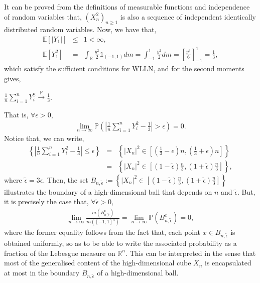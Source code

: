 \documentclass{article}
\begin{document}
It can be proved from the definitions of measurable functions and independence of random variables that, $(X_n^2)_{n\geq1}$ is also a sequence of independent identically distributed random variables. Now, we have that,
\begin{eqnarray}
\nonumber
\mathbb{E}[|Y_1|] &\leq& 1 < \infty,\\
\nonumber
\mathbb{E}[Y_1^2] &=& \int_\mathbb{R}\frac{y^2}{2} \mathds{1}_{(-1,1)}dm = \int_{-1}^{1}\frac{y^2}{2}dm = \left[\frac{y^3}{6}\right]_{-1}^{1} = \frac{1}{3},
\end{eqnarray}
which satisfy the sufficient conditions for WLLN, and for the second moments gives,
\begin{center}
$\frac{1}{n}\sum_{i=1}^{n}Y_i^2 \xrightarrow{\mathbb{P}} \frac{1}{3}$.
\end{center}
That is, $\forall \epsilon > 0$,
\begin{eqnarray}
\nonumber
\lim_{n\to\infty}\mathbb{P}\left(\left|\frac{1}{n}\sum_{i=1}^{n}Y_i^2 - \frac{1}{3}\right| > \epsilon\right) = 0.
\end{eqnarray}
Notice that, we can write,
\begin{eqnarray}
\nonumber
\left\{\left|\frac{1}{n}\sum_{i=1}^{n}Y_i^2 - \frac{1}{3}\right| \leq \epsilon\right\} &=& \left\{|X_n|^2 \in \left[\left(\frac{1}{3} - \epsilon\right)n,\left(\frac{1}{3} + \epsilon\right)n\right]\right\}\\
\nonumber
&=& \left\{|X_n|^2 \in \left[\left(1 - \tilde{\epsilon}\right)\frac{n}{3},\left(1 + \tilde{\epsilon}\right)\frac{n}{3}\right]\right\},
\end{eqnarray}
where $\tilde{\epsilon} = 3\epsilon$. Then, the set $B_{n,\tilde{\epsilon}} := \left\{|X_n|^2 \in \left[\left(1 - \tilde{\epsilon}\right)\frac{n}{3},\left(1 + \tilde{\epsilon}\right)\frac{n}{3}\right]\right\}$ illustrates the boundary of a high-dimensional ball that depends on $n$ and $\tilde{\epsilon}$. But, it is precisely the case that, $\forall \tilde{\epsilon} > 0$,
\begin{eqnarray}
\nonumber
\lim_{n\to\infty}\frac{m(B_{n,\tilde{\epsilon}}^c)}{m([-1,1]^n)} = \lim_{n\to\infty}\mathbb{P}(B_{n,\tilde{\epsilon}}^c) = 0,
\end{eqnarray}
where the former equality follows from the fact that, each point $x \in B_{n,\tilde{\epsilon}}$ is obtained uniformly, so as to be able to write the associated probability as a fraction of the Lebesgue measure on $\mathbb{R}^n$. This can be interpreted in the sense that most of the generalised content of the high-dimensional cube $X_n$ is encapsulated at most in the boundary $B_{n,\tilde{\epsilon}}$ of a high-dimensional ball.\\\\
\end{document}
